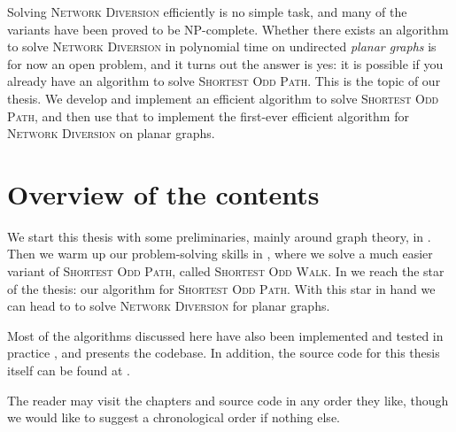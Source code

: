 Solving \textsc{Network Diversion} efficiently is no simple task, and many of the variants have been proved to be NP-complete. Whether there exists an algorithm to solve \textsc{Network Diversion} in polynomial time on undirected \emph{planar graphs} is for now an open problem, and it turns out the answer is yes: it is possible if you already have an algorithm to solve \textsc{Shortest Odd Path}. This is the topic of our thesis. We develop and implement an efficient algorithm to solve \textsc{Shortest Odd Path}, and then use that to implement the first-ever efficient algorithm for \textsc{Network Diversion} on planar graphs.

\section*{Overview of the contents}
We start this thesis with some preliminaries, mainly around graph theory, in . Then we warm up our problem-solving skills in , where we solve a much easier variant of \textsc{Shortest Odd Path}, called \textsc{Shortest Odd Walk}. In  we reach the star of the thesis: our algorithm for \textsc{Shortest Odd Path}. With this star in hand we can head to  to solve \textsc{Network Diversion} for planar graphs. 

Most of the algorithms discussed here have also been implemented and tested in practice \cite{source:codebase}, and  presents the codebase. In addition, the source code for this thesis itself can be found at \cite{source:thesis}.

The reader may visit the chapters and source code in any order they like, though we would like to suggest a chronological order if nothing else.
